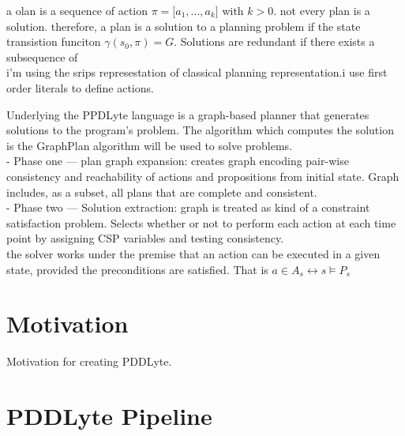 \documentclass[
a4paper, %
11pt, %
onecolumn, %
openany, %
]{memoir}
\begin{document}
a olan is a sequence of action $\pi = \lbrack a_1, ... ,a_k\rbrack$ with $k>0$. not every plan is a solution. therefore, a plan is a solution to a planning problem if the state transistion funciton $\gamma(s_0,\pi) = G$. Solutions are redundant if there exists a subsequence of \\

i'm using the srips represestation of classical planning representation.i use first order literals to define actions.


Underlying the PPDLyte language is a graph-based planner that generates solutions to the program's problem. The algorithm which computes the solution is the GraphPlan \cite{source} algorithm will be used to solve problems.\\

- Phase one --- plan graph expansion: creates graph encoding pair-wise consistency and reachability of actions and propositions from initial state. Graph includes, as a subset, all plans that are complete and consistent.\\
- Phase two --- Solution extraction: graph is treated as kind of a constraint satisfaction problem. Selects whether or not to perform each action at each time point by assigning CSP variables and testing consistency.\\

the solver works under the premise that an action can be executed in a given state, provided the preconditions are satisfied. That is $a \in A_{s} \leftrightarrow s \models P_{s}$

\section{Motivation}
Motivation for creating PDDLyte.


\section{PDDLyte Pipeline}
\end{document}
